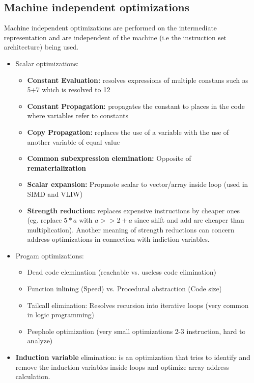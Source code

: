 \documentclass[a4paper,10pt]{article}
\begin{document}
\subsection{Machine independent optimizations}
Machine independent optimizations are performed on the intermediate representation and are independent of the machine (i.e the instruction
set architecture) being used.
\begin{itemize}
 \item Scalar optimizations:
 \begin{itemize}
     \item \textbf{Constant Evaluation:} resolves expressions of multiple constans such as 5+7 which is resolved to 12
     \item \textbf{Constant Propagation:} propagates the constant to places in the code where variables refer to constants
     \item \textbf{Copy Propagation:} replaces the use of a variable with the use of another variable of equal value
     \item \textbf{Common subexpression elemination:} Opposite of \textbf{rematerialization}
     \item \textbf{Scalar expansion:} Propmote scalar to vector/array inside loop (used in SIMD and VLIW)
     \item \textbf{Strength reduction:} replaces expensive instructions by cheaper ones (eg. replace $5*a$ with $a>>2+a$ since shift and add are cheaper than multiplication). Another meaning of strength reductions can concern address optimizations in connection with indiction variables.
 \end{itemize}
 \item Progam optimizations:
 \begin{itemize}
     \item Dead code elemination (reachable vs. useless code elimination)
     \item Function inlining (Speed) vs. Procedural abstraction (Code size)
     \item Tailcall elimination: Resolves recursion into iterative loops (very common in logic programming)
     \item Peephole optimization (very small optimizations 2-3 instruction, hard to analyze)
 \end{itemize}
 \item \textbf{Induction variable} elimination: is an optimization that tries to identify and remove the induction variables inside loops and optimize array address calculation.

\end{itemize}
\end{document}
